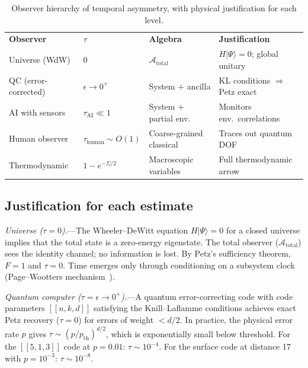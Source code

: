 \documentclass[aps,prd,preprint,superscriptaddress,longbibliography]{revtex4-2}
\newcommand{\ket}[1]{|#1\rangle}
\newcommand{\tauasym}{\tau}
\newcommand{\algO}{\mathcal{A}}
\begin{document}
\begin{table}[h]
\caption{\label{tab:hierarchy_detail}Observer hierarchy of temporal
asymmetry, with physical justification for each level.}
\begin{ruledtabular}
\begin{tabular}{llll}
  \textbf{Observer} & $\tauasym$ & \textbf{Algebra}
    & \textbf{Justification} \\
  \colrule
  Universe (WdW) & $0$
    & $\algO_{\mathrm{total}}$
    & $H\ket{\Psi}=0$; global unitary \\[4pt]
  QC (error-corrected) & $\epsilon \to 0^+$
    & System $+$ ancilla
    & KL conditions $\Rightarrow$ Petz exact \\[4pt]
  AI with sensors & $\tauasym_{\mathrm{AI}} \ll 1$
    & System $+$ partial env.
    & Monitors env.\ correlations \\[4pt]
  Human observer & $\tauasym_{\mathrm{human}} \sim O(1)$
    & Coarse-grained classical
    & Traces out quantum DOF \\[4pt]
  Thermodynamic & $1 - e^{-\Sigma/2}$
    & Macroscopic variables
    & Full thermodynamic arrow \\
\end{tabular}
\end{ruledtabular}
\end{table}

\subsection{Justification for each estimate}

\emph{Universe ($\tauasym = 0$).}---The Wheeler--DeWitt equation
$H\ket{\Psi} = 0$ for a closed universe implies that the total state
is a zero-energy eigenstate.  The total observer ($\algO_{\mathrm{total}}$)
sees the identity channel; no information is lost.  By Petz's
sufficiency theorem, $F = 1$ and $\tauasym = 0$.  Time emerges only
through conditioning on a subsystem clock (Page--Wootters
mechanism~\cite{PageWootters1983}).

\emph{Quantum computer ($\tauasym = \epsilon \to 0^+$).}---A quantum
error-correcting code with code parameters $[\![n,k,d]\!]$ satisfying
the Knill--Laflamme conditions achieves exact Petz recovery
($\tauasym = 0$) for errors of weight $< d/2$.  In practice, the
physical error rate $p$ gives $\tauasym \sim (p/p_{\mathrm{th}})^{d/2}$,
which is exponentially small below threshold.  For the
$[\![5,1,3]\!]$ code at $p = 0.01$: $\tauasym \sim 10^{-4}$.
For the surface code at distance 17 with $p = 10^{-3}$:
$\tauasym \sim 10^{-8}$.
\end{document}
